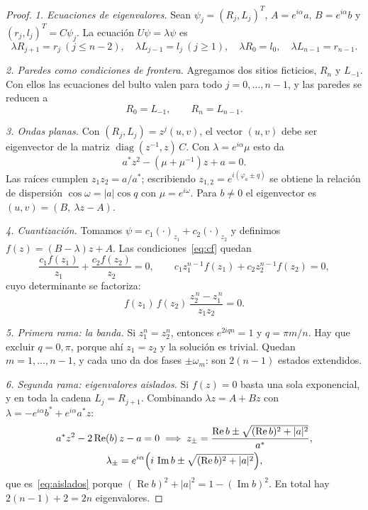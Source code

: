 \documentclass[11pt,a4paper]{article}
\theoremstyle{remark}
\newcommand{\im}{\operatorname{Im}}
\newcommand{\re}{\operatorname{Re}}
\begin{document}
\begin{proof}
\emph{1. Ecuaciones de eigenvalores.} Sean $\psi_j=(R_j,L_j)^T$,
$A=e^{i\alpha}a$, $B=e^{i\alpha}b$ y $(r_j,l_j)^T=C\psi_j$. La ecuación
$U\psi=\lambda\psi$ es
\begin{equation}
\lambda R_{j+1}=r_j\ (j\le n-2),\quad
\lambda L_{j-1}=l_j\ (j\ge1),\quad
\lambda R_0=l_0,\quad
\lambda L_{n-1}=r_{n-1}.
\end{equation}

\emph{2. Paredes como condiciones de frontera.} Agregamos dos sitios
ficticios, $R_n$ y $L_{-1}$. Con ellos las ecuaciones del bulto valen para todo
$j=0,\dots,n-1$, y las paredes se reducen a
\begin{equation}
R_0=L_{-1},\qquad R_n=L_{n-1}. \label{eq:cf}
\end{equation}

\emph{3. Ondas planas.} Con $(R_j,L_j)=z^j(u,v)$, el vector $(u,v)$ debe ser
eigenvector de la matriz $\operatorname{diag}(z^{-1},z)\,C$. Con $\lambda=e^{i\alpha}\mu$
esto da
\begin{equation}
a^*z^2-(\mu+\mu^{-1})z+a=0. \label{eq:cuadratica}
\end{equation}
Las raíces cumplen $z_1z_2=a/a^*$; escribiendo
$z_{1,2}=e^{i(\varphi_a\pm q)}$ se obtiene la relación de dispersión
$\cos\omega=|a|\cos q$ con $\mu=e^{i\omega}$. Para $b\neq0$ el eigenvector es
$(u,v)=(B,\ \lambda z-A)$.

\emph{4. Cuantización.} Tomamos $\psi=c_1(\cdot)_{z_1}+c_2(\cdot)_{z_2}$ y
definimos $f(z)=(B-\lambda)z+A$. Las condiciones~\eqref{eq:cf} quedan
\begin{equation}
\frac{c_1f(z_1)}{z_1}+\frac{c_2f(z_2)}{z_2}=0,\qquad
c_1z_1^{n-1}f(z_1)+c_2z_2^{n-1}f(z_2)=0,
\end{equation}
cuyo determinante se factoriza:
\begin{equation}
f(z_1)\,f(z_2)\,\frac{z_2^{\,n}-z_1^{\,n}}{z_1z_2}=0. \label{eq:det}
\end{equation}

\emph{5. Primera rama: la banda.} Si $z_1^n=z_2^n$, entonces $e^{2iqn}=1$ y
$q=\pi m/n$. Hay que excluir $q=0,\pi$, porque ahí $z_1=z_2$ y la solución es
trivial. Quedan $m=1,\dots,n-1$, y cada uno da dos fases $\pm\omega_m$: son
$2(n-1)$ estados extendidos.

\emph{6. Segunda rama: eigenvalores aislados.} Si $f(z)=0$ basta una sola
exponencial, y en toda la cadena $L_j=R_{j+1}$. Combinando $\lambda z=A+Bz$
con $\lambda=-e^{i\alpha}b^*+e^{i\alpha}a^*z$:
\begin{gather}
a^*z^2-2\re(b)\,z-a=0
\;\Longrightarrow\;
z_\pm=\frac{\re b\pm\sqrt{(\re b)^2+|a|^2}}{a^*},\\
\lambda_\pm=e^{i\alpha}\Bigl(i\,\im b\pm\sqrt{(\re b)^2+|a|^2}\Bigr),
\end{gather}
que es~\eqref{eq:aislados} porque $(\re b)^2+|a|^2=1-(\im b)^2$. En total hay
$2(n-1)+2=2n$ eigenvalores.
\end{proof}
\end{document}
